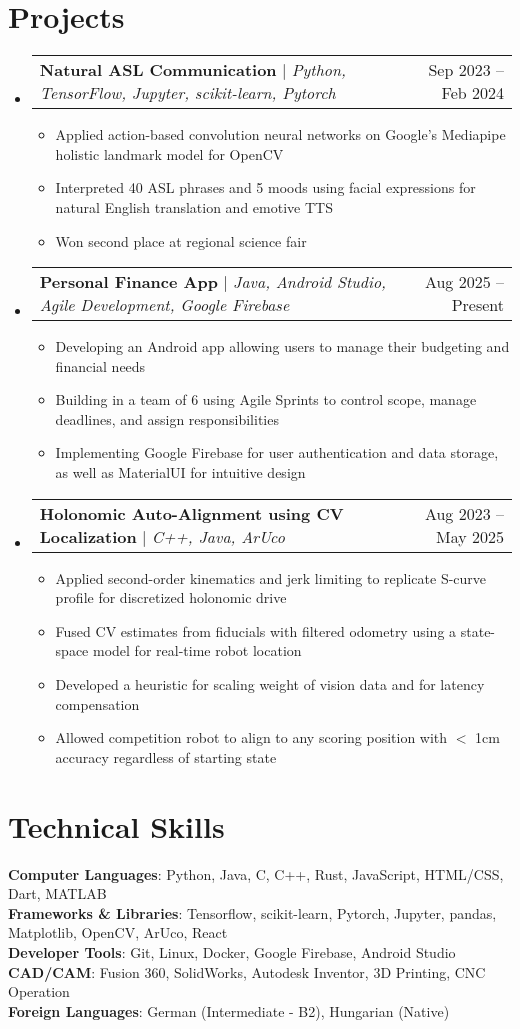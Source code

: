 \documentclass[letterpaper,11pt]{article}
\makeatletter
\newcommand{\resumeItem}[1]{
  \item\small{
    {#1 \vspace{-2pt}}
  }
}
\newcommand{\resumeProjectHeading}[2]{
    \item
    \begin{tabular*}{0.97\textwidth}{l@{\extracolsep{\fill}}r}
      \small#1 & #2 \\
    \end{tabular*}\vspace{-7pt}
}
\newcommand{\resumeSubHeadingListStart}{\begin{itemize}[leftmargin=0.15in, label={}]}
\newcommand{\resumeSubHeadingListEnd}{\end{itemize}}
\newcommand{\resumeItemListStart}{\begin{itemize}}
\newcommand{\resumeItemListEnd}{\end{itemize}\vspace{-5pt}}
\makeatother
\begin{document}
\section{Projects}
    \resumeSubHeadingListStart
        \resumeProjectHeading
          {\textbf{Natural ASL Communication} $|$ \emph{Python, TensorFlow, Jupyter, scikit-learn, Pytorch}}{Sep 2023 -- Feb 2024}
          \resumeItemListStart
            \resumeItem{Applied action-based convolution neural networks on Google's Mediapipe holistic landmark model for OpenCV}
            \resumeItem{Interpreted 40 ASL phrases and 5 moods using facial expressions for natural English translation and emotive TTS}
            \resumeItem{Won second place at regional science fair}
          \resumeItemListEnd
        \resumeProjectHeading
          {\textbf{Personal Finance App} $|$ \emph{Java, Android Studio, Agile Development, Google Firebase}}{Aug 2025 -- Present}
          \resumeItemListStart
            \resumeItem{Developing an Android app allowing users to manage their budgeting and financial needs}
            \resumeItem{Building in a team of 6 using Agile Sprints to control scope, manage deadlines, and assign responsibilities}
            \resumeItem{Implementing Google Firebase for user authentication and data storage, as well as MaterialUI for intuitive design}
          \resumeItemListEnd
      \resumeProjectHeading
          {\textbf{Holonomic Auto-Alignment using CV Localization} $|$ \emph{C++, Java, ArUco}}{Aug 2023 -- May 2025}
          \resumeItemListStart
            \resumeItem{Applied second-order kinematics and jerk limiting to replicate S-curve profile for discretized holonomic drive}
            \resumeItem{Fused CV estimates from fiducials with filtered odometry using a state-space model for real-time robot location}
            \resumeItem{Developed a heuristic for scaling weight of vision data and for latency compensation}
            \resumeItem{Allowed competition robot to align to any scoring position with $<$ 1cm accuracy regardless of starting state}
          \resumeItemListEnd
    \resumeSubHeadingListEnd



%
\section{Technical Skills}
 \begin{itemize}[leftmargin=0.15in, label={}]
    \small{\item{
     \textbf{Computer Languages}{: Python, Java, C, C++, Rust, JavaScript, HTML/CSS, Dart, MATLAB} \\
     \textbf{Frameworks \& Libraries}{: Tensorflow, scikit-learn, Pytorch, Jupyter, pandas, Matplotlib, OpenCV, ArUco, React} \\
     \textbf{Developer Tools}{: Git, Linux, Docker, Google Firebase, Android Studio} \\
     \textbf{CAD/CAM}{: Fusion 360, SolidWorks, Autodesk Inventor, 3D Printing, CNC Operation} \\
     \textbf{Foreign Languages}{: German (Intermediate - B2), Hungarian (Native)}
    }}
 \end{itemize}


\end{document}
